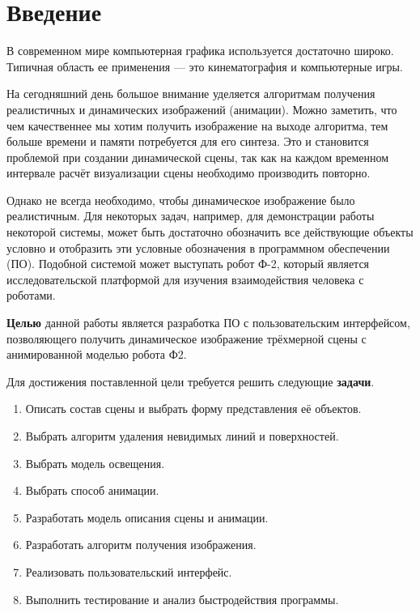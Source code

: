 
\chapter*{Введение}

В современном мире компьютерная графика используется достаточно широко. Типичная область ее применения --– это кинематография и компьютерные игры.

На сегодняшний день большое внимание уделяется алгоритмам получения реалистичных и динамических изображений (анимации). 
Можно заметить, что чем качественнее мы хотим получить изображение на выходе алгоритма, тем больше времени и памяти потребуется для его синтеза. Это и становится проблемой при создании динамической сцены, так как на каждом временном интервале расчёт визуализации сцены необходимо производить повторно.

Однако не всегда необходимо, чтобы динамическое изображение было реалистичным. Для некоторых задач, например, для демонстрации работы некоторой системы, может быть достаточно обозначить все действующие объекты условно и отобразить эти условные обозначения в программном обеспечении (ПО). Подобной системой может выступать робот Ф-2, который является исследовательской платформой для изучения взаимодействия человека с роботами.

\textbf{Целью} данной работы является разработка ПО с пользовательским интерфейсом, позволяющего получить динамическое изображение трёхмерной сцены с анимированной моделью робота Ф2.

Для достижения поставленной цели требуется решить следующие \textbf{задачи}.

\begin{enumerate}
	\item Описать состав сцены и выбрать форму представления её объектов.
	
	\item Выбрать алгоритм удаления невидимых линий и поверхностей.
	
	\item Выбрать модель освещения.
	
	\item Выбрать способ анимации.

	\item Разработать модель описания сцены и анимации.
	
	\item Разработать алгоритм получения изображения.
	
	\item Реализовать пользовательский интерфейс.
	
	\item Выполнить тестирование и анализ быстродействия программы.
	
\end{enumerate}

\newpage 